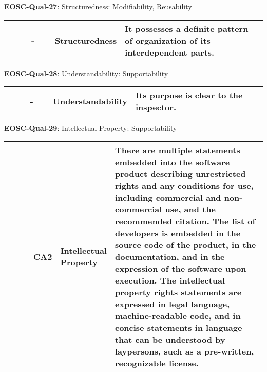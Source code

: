 \textbf{EOSC-Qual-27}: Structuredness: Modifiability, Reusability
\nopagebreak[4]
\begin{center}
    \tabletail{\hline}
    \tiny
    \begin{supertabular}{|p{0.10\linewidth}|p{0.10\linewidth}|p{0.20\linewidth}|p{0.60\linewidth}|} \hline
        \cite{boehm_quantitative_1976} & - & Structuredness & It possesses a definite pattern of organization of its interdependent parts.\\ \hline
    \end{supertabular}
\end{center}

\textbf{EOSC-Qual-28}: Understandability: Supportability
\nopagebreak[4]
\begin{center}
    \tabletail{\hline}
    \tiny
    \begin{supertabular}{|p{0.10\linewidth}|p{0.10\linewidth}|p{0.20\linewidth}|p{0.60\linewidth}|} \hline
        \cite{boehm_quantitative_1976} & - & Understandability & Its purpose is clear to the inspector.\\ \hline
    \end{supertabular}
\end{center}

\textbf{EOSC-Qual-29}: Intellectual Property: Supportability
\nopagebreak[4]
\begin{center}
    \tabletail{\hline}
    \tiny
    \begin{supertabular}{|p{0.10\linewidth}|p{0.10\linewidth}|p{0.20\linewidth}|p{0.60\linewidth}|} \hline
        \cite{shepherdson_cessda_2019} & CA2 & Intellectual Property & There are multiple statements embedded into the software product describing unrestricted rights and any conditions for use, including commercial and non-commercial use, and the recommended citation. The list of developers is embedded in the source code of the product, in the documentation, and in the expression of the software upon execution. The intellectual property rights statements are expressed in legal language, machine-readable code, and in concise statements in language that can be understood by laypersons, such as a pre-written, recognizable license.\\ \hline
    \end{supertabular}
\end{center}

